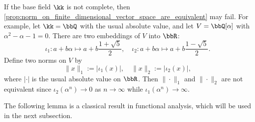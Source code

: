     \begin{remark}\label{rmk:finite-dimensional_vector_space_over_non_complete_fields}
        If the base field \(\kk\) is not complete, then \cref{prop:norm_on_finite_dimensional_vector_space_are_equivalent} may fail.
        For example, let \(\kk = \bbQ\) with the usual absolute value, and let \(V = \bbQ[\alpha]\) with \(\alpha^2-\alpha-1=0\).
        There are two embeddings of \(V\) into \(\bbR\):
        \[ \iota_1: a + b\alpha \mapsto a + b\frac{1+\sqrt{5}}{2}, \quad \iota_2: a + b\alpha \mapsto a + b\frac{1-\sqrt{5}}{2}. \]
        Define two norms on \(V\) by
        \[
            \|x\|_1 := |\iota_1(x)|, \quad \|x\|_2 := |\iota_2(x)|,
        \]
        where \(|\cdot|\) is the usual absolute value on \(\bbR\).
        Then \(\|\cdot\|_1\) and \(\|\cdot\|_2\) are not equivalent since \(\iota_2(\alpha^n) \to 0\) as \(n \to \infty\) while \(\iota_1(\alpha^n) \to \infty\).
    \end{remark}

    The following lemma is a classical result in functional analysis, which will be used in the next subsection.

